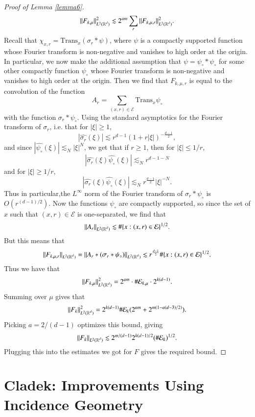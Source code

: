 \begin{proof}[Proof of Lemma \ref{lemma6}]
    \[ \| F_{k,\mu} \|_{L^2(\operatorname{\mathbb{R}}^d)}^2 \lesssim 2^{am} \sum_r \| F_{k,\mu,r} \|_{L^2(\operatorname{\mathbb{R}}^d)}^2. \]
    Recall that $\chi_{x,r} = \text{Trans}_x(\sigma_r * \psi)$, where $\psi$ is a compactly supported function whose Fourier transform is non-negative and vanishes to high order at the origin. In particular, we now make the additional assumption that $\psi = \psi_{\circ} * \psi_{\circ}$ for some other compactly function $\psi_{\circ}$ whose Fourier transform is non-negative and vanishes to high order at the origin. Then we find that $F_{k,\mu,r}$ is equal to the convolution of the function
    \[ A_r = \sum_{(x,r) \in \mathcal{E}} \text{Trans}_x \psi_{\circ} \]
    with the function $\sigma_r * \psi_{\circ}$. Using the standard asymptotics for the Fourier transform of $\sigma_r$, i.e. that for $|\xi| \geq 1$,
    \[ |\widehat{\sigma_r}(\xi)| \lesssim r^{d-1} (1 + r |\xi|)^{- \frac{d-1}{2}}, \]
    and since $|\widehat{\psi_\circ}(\xi)| \lesssim_N |\xi|^N$, we get that if $r \geq 1$, then for $|\xi| \leq 1/r$,
    \[ |\widehat{\sigma_r}(\xi) \widehat{\psi_\circ}(\xi)| \lesssim_N r^{d-1-N} \]
    and for $|\xi| \geq 1/r$,
    \[ |\widehat{\sigma_r}(\xi) \widehat{\psi_\circ}(\xi)| \lesssim_N r^{\frac{d-1}{2}} |\xi|^{-N}. \]
    Thus in particular,the $L^\infty$ norm of the Fourier transform of $\sigma_r * \psi_\circ$ is $O(r^{(d-1)/2})$. Now the functions $\psi_{\circ}$ are compactly supported, so since the set of $x$ such that $(x,r) \in \mathcal{E}$ is one-separated, we find that
    \[ \| A_r \|_{L^2(\operatorname{\mathbb{R}}^d)} \lesssim \# \{ x : (x,r) \in \mathcal{E} \}^{1/2}. \]
    But this means that
    \[ \| F_{k,\mu,r} \|_{L^2(\operatorname{\mathbb{R}}^d)} = \| A_r * (\sigma_r * \psi_{\circ}) \|_{L^2(\operatorname{\mathbb{R}}^d)} \lesssim r^{\frac{d-1}{2}} \# \{ x : (x,r) \in \mathcal{E} \}^{1/2}. \]
    Thus we have that
    \[ \| F_{k,\mu} \|_{L^2(\operatorname{\mathbb{R}}^d)}^2 = 2^{am} \cdot \# \mathcal{E}_{k,\mu} \cdot 2^{k(d-1)}. \]
    Summing over $\mu$ gives that
    \[ \| F_k \|_{L^2(\operatorname{\mathbb{R}}^d)}^2 = 2^{k(d-1)} \# \mathcal{E}_k (2^{am}  + 2^{m(1 - a(d-3)/2)}). \]
    Picking $a = 2/(d-1)$ optimizes this bound, giving
    \[ \| F_k \|_{L^2(\operatorname{\mathbb{R}}^d)} \lesssim 2^{m/(d-1)} 2^{k(d-1)/2} (\# \mathcal{E}_k)^{1/2}. \]
    Plugging this into the estimates we got for $F$ gives the required bound.
\end{proof}

\chapter{Cladek: Improvements Using Incidence Geometry} \label{Cladek}

